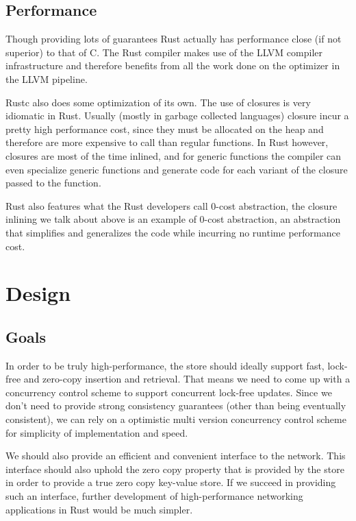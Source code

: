 \documentclass[11pt]{article}
\begin{document}
\subsection{Performance}
Though providing lots of guarantees Rust actually has performance
close (if not superior) to that of C. The Rust compiler makes use of
the LLVM compiler infrastructure and therefore benefits from all the
work done on the optimizer in the LLVM pipeline.

Rustc also does some optimization of its own. The use of closures is very
idiomatic in Rust. Usually (mostly in garbage collected languages)
closure incur a pretty high performance cost, since they must be
allocated on the heap and therefore are more expensive to call than
regular functions. In Rust however, closures are most of the time
inlined, and for generic functions the compiler can even specialize
generic functions and generate code for each variant of the closure
passed to the function.

Rust also features what the Rust developers call 0-cost abstraction,
the closure inlining we talk about above is an example of 0-cost
abstraction, an abstraction that simplifies and generalizes the code
while incurring no runtime performance cost.

\section{Design}

\subsection{Goals}
In order to be truly high-performance, the store should ideally
support fast, lock-free and zero-copy insertion and retrieval. That
means we need to come up with a concurrency control scheme to support
concurrent lock-free updates. Since we don't need to provide strong
consistency guarantees (other than being eventually consistent), we
can rely on a optimistic multi version concurrency control scheme for
simplicity of implementation and speed.

We should also provide an efficient and convenient interface to the
network. This interface should also uphold the zero copy property that
is provided by the store in order to provide a true zero copy
key-value store. If we succeed in providing such an interface, further
development of high-performance networking applications in Rust would
be much simpler.
\end{document}
